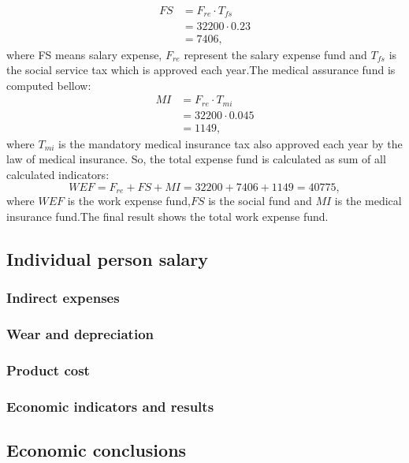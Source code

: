\begin{equation}
\label{eq:sf}
\begin{split}
FS  &= F_{re} \cdot T_{fs} \\
	&= 32200 \cdot 0.23  \\	
	&= 7406,
\end{split}
\end{equation}
\noindent
where FS means salary expense, $F_{re}$ represent the salary expense fund and $T_{fs}$ is the social service tax which is approved each year.The medical assurance fund is computed bellow:
\begin{equation}
\begin{split}
MI  &= F_{re} \cdot T_{mi}\\ 
	&= 32200 \cdot 0.045\\ 
	&= 1149,
\end{split}
\end{equation}
where $T_{mi}$ is the mandatory medical insurance tax also approved each year by the law of medical insurance.
So, the total expense fund is calculated as sum of all calculated indicators:
\begin{equation}
WEF = F_{re} + FS + MI = 
32200 + 7406 + 1149 = 40775,
\end{equation}
where $WEF$ is the work expense fund,$FS$ is the social fund and $MI$ is the medical insurance fund.The final result shows the total work expense fund.
\subsection{Individual person salary}
\subsubsection{Indirect expenses}
\subsubsection{Wear and depreciation}
\subsubsection{Product cost}
\subsubsection{Economic indicators and results}
\subsection{Economic conclusions}